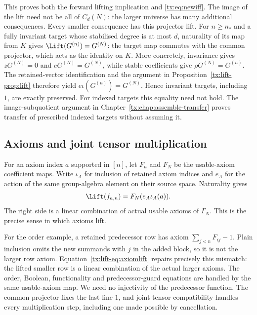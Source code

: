 \documentclass[11pt,a4paper,oneside,openany]{book}
\theoremstyle{definition}\newtheorem{definition}[theorem]{Definition}
\theoremstyle{remark}\newtheorem{remark}[theorem]{Remark}
\numberwithin{equation}{chapter}
\begin{document}
This proves both the forward lifting implication and
\eqref{tx:eq:newiff}. The image of the lift need not be all of $C_d(N)$:
the larger universe has many additional consequences. Every smaller consequence has this projector lift. For $n\ge n_*$ and a fully invariant target whose stabilised degree
is at most $d$, naturality of its map from $K$ gives
$\Lift(G^{(n)})=G^{(N)}$: the target map commutes with the common projector,
which acts as the identity on $K$. More concretely, invariance gives
$zG^{(N)}=0$ and $eG^{(N)}=G^{(N)}$, while stable coefficients give
$\rho G^{(N)}=G^{(n)}$. The retained-vector identification and the argument
in Proposition~\ref{tx:lift-prop:lift} therefore yield $e\iota(G^{(n)})=G^{(N)}$. Hence invariant targets, including
$1$, are exactly preserved. For indexed targets this equality need
not hold. The image-subquotient argument in
Chapter~\ref{tx:chap:assemble-transfer} proves transfer of
prescribed indexed targets without assuming it.

\subsection{Axioms and joint tensor multiplication}
For an axiom index $a$ supported in $[n]$, let $F_n$ and $F_N$ be the
usable-axiom coefficient maps. Write $\iota_A$ for inclusion of retained
axiom indices and $e_A$ for the action of the same group-algebra element
on their source space. Naturality gives
\begin{equation}\label{tx:lift-eq:axiomlift}
             \Lift(f_{a,n})=F_N(e_A\iota_A(a)).
\end{equation}
The right side is a linear combination of actual usable axioms of
$\Gamma_N$. This is the precise sense in which axioms lift.

For the order example, a retained predecessor row has axiom
$\sum_{j<n}F_{ij}-1$. Plain inclusion omits the new summands with
$j$ in the added block, so it is not the larger row axiom.
Equation~\eqref{tx:lift-eq:axiomlift} repairs precisely this mismatch:
the lifted smaller row is a linear combination of the actual larger
axioms. The order, Boolean, functionality and predecessor-guard
equations are handled by the same usable-axiom map. We need no
injectivity of the predecessor function. The common projector fixes
the last line $1$, and joint tensor compatibility handles every
multiplication step, including one made possible by cancellation.
\end{document}
